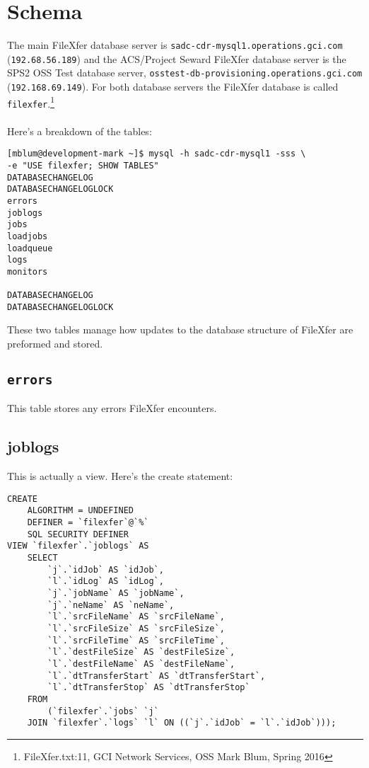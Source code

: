 
\newpage
\section{Schema}
The main FileXfer database server is
\texttt{sadc-cdr-mysql1.operations.gci.com}
(\texttt{192.68.56.189}) and the ACS/Project Seward
FileXfer database server is the SPS2 OSS Test database
server, \texttt{osstest-db-provisioning.operations.gci.com}
(\texttt{192.168.69.149}).  For both database servers
the FileXfer database is called \texttt{filexfer}.\footnote{FileXfer.txt:11, GCI Network Services, OSS Mark Blum, Spring 2016}\\
\\
\noindent Here's a breakdown of the tables:
\begin{verbatim}
[mblum@development-mark ~]$ mysql -h sadc-cdr-mysql1 -sss \
-e "USE filexfer; SHOW TABLES"
DATABASECHANGELOG
DATABASECHANGELOGLOCK
errors
joblogs
jobs
loadjobs
loadqueue
logs
monitors

DATABASECHANGELOG
DATABASECHANGELOGLOCK

\end{verbatim}

\noindent These two tables manage how updates to the database structure
of FileXfer are preformed and stored.

\subsection{\texttt{errors}}
This table stores any errors FileXfer encounters.

\subsection{joblogs}
This is actually a view.  Here's the create statement:

\begin{verbatim}
CREATE 
    ALGORITHM = UNDEFINED 
    DEFINER = `filexfer`@`%` 
    SQL SECURITY DEFINER
VIEW `filexfer`.`joblogs` AS
    SELECT 
        `j`.`idJob` AS `idJob`,
        `l`.`idLog` AS `idLog`,
        `j`.`jobName` AS `jobName`,
        `j`.`neName` AS `neName`,
        `l`.`srcFileName` AS `srcFileName`,
        `l`.`srcFileSize` AS `srcFileSize`,
        `l`.`srcFileTime` AS `srcFileTime`,
        `l`.`destFileSize` AS `destFileSize`,
        `l`.`destFileName` AS `destFileName`,
        `l`.`dtTransferStart` AS `dtTransferStart`,
        `l`.`dtTransferStop` AS `dtTransferStop`
    FROM
        (`filexfer`.`jobs` `j`
    JOIN `filexfer`.`logs` `l` ON ((`j`.`idJob` = `l`.`idJob`)));
\end{verbatim}

